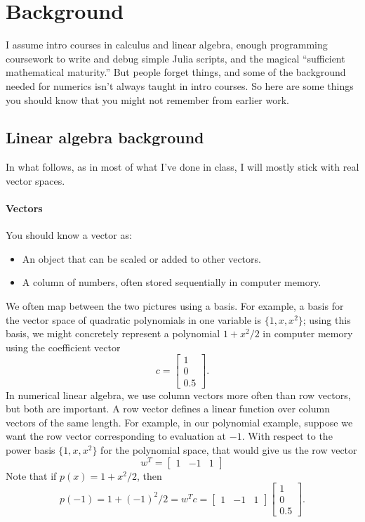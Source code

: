 \documentclass[12pt, leqno]{article}
\begin{document}
\section{Background}

I assume intro courses in calculus and linear algebra, enough
programming coursework to write and debug simple Julia scripts, and
the magical ``sufficient mathematical maturity.''  But people
forget things, and some of the background needed for numerics
isn't always taught in intro courses.  So here are some things
you should know that you might not remember from earlier work.

\subsection{Linear algebra background}

In what follows, as in most of what I've done in class, I will mostly
stick with real vector spaces.

\paragraph{Vectors}
You should know a vector as:
\begin{itemize}
\item An object that can be scaled or added to other vectors.
\item A column of numbers, often stored sequentially
  in computer memory.
\end{itemize}
We often map between the two pictures using a basis.  For example,
a basis for the vector space of quadratic polynomials in one variable
is $\{1, x, x^2\}$; using this basis, we might concretely represent a
polynomial $1 + x^2/2$ in computer memory using the coefficient
vector
\[
  c = \begin{bmatrix} 1 \\ 0 \\ 0.5 \end{bmatrix}.
\]
In numerical linear algebra, we use column vectors more often than
row vectors, but both are important.  A row vector defines a linear
function over column vectors of the same length.  For example,
in our polynomial example, suppose we want the row vector
corresponding to evaluation at $-1$.  With respect to the power basis
$\{1, x, x^2\}$ for the polynomial space, that would give us the
row vector
\[
  w^T = \begin{bmatrix} 1 & -1 & 1 \end{bmatrix}
\]
Note that if $p(x) = 1+x^2/2$, then
\[
  p(-1) = 1 + (-1)^2/2
  = w^T c
  = \begin{bmatrix} 1 & -1 & 1 \end{bmatrix}
    \begin{bmatrix} 1 \\ 0 \\ 0.5 \end{bmatrix}.
\]
\end{document}
